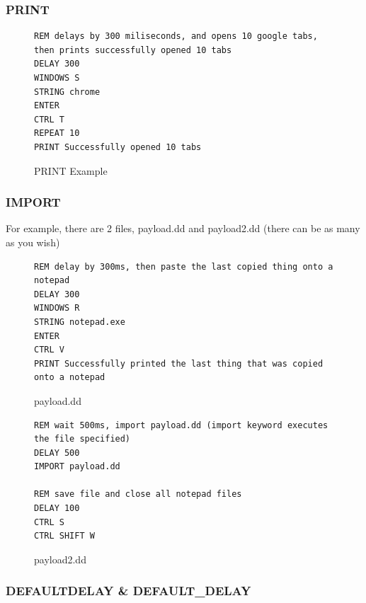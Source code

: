\documentclass[a4paper,12pt]{article}
\begin{document}
\newpage

\subsubsection{PRINT}

\begin{figure}[htb]
\begin{small}
\begin{lstlisting}[language=Ducky]
REM delays by 300 miliseconds, and opens 10 google tabs, then prints successfully opened 10 tabs
DELAY 300
WINDOWS S
STRING chrome
ENTER
CTRL T
REPEAT 10
PRINT Successfully opened 10 tabs
\end{lstlisting}
\end{small}
\caption{PRINT Example}
\end{figure}

\newpage

\subsubsection{IMPORT}\label{ducky_import}
For example, there are 2 files, payload.dd and payload2.dd (there can be as many as you wish)
\begin{figure}[htb]
\begin{small}
\begin{lstlisting}[language=Ducky]
REM delay by 300ms, then paste the last copied thing onto a notepad
DELAY 300
WINDOWS R
STRING notepad.exe
ENTER
CTRL V
PRINT Successfully printed the last thing that was copied onto a notepad
\end{lstlisting}
\end{small}
\caption{payload.dd}
\end{figure}

\begin{figure}[htb]
\begin{small}
\begin{lstlisting}[language=Ducky]
REM wait 500ms, import payload.dd (import keyword executes the file specified)
DELAY 500
IMPORT payload.dd

REM save file and close all notepad files
DELAY 100
CTRL S
CTRL SHIFT W
\end{lstlisting}
\end{small}
\caption{payload2.dd}
\end{figure}

\newpage

\subsubsection{DEFAULTDELAY \& DEFAULT\_DELAY}
\end{document}
